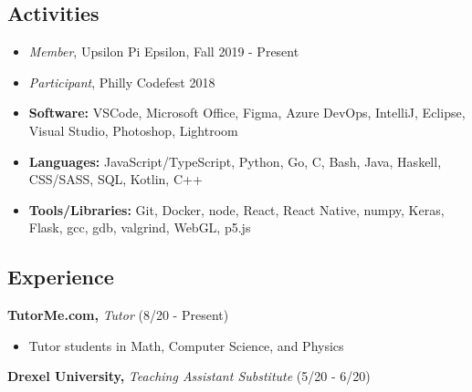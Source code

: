 \documentclass[10pt]{article}
\begin{document}
\begin{multicols}{2}
    \vspace{-\topsep}
    \subsection*{Activities}%
    \label{sub:Activities}

    \vspace{-\topsep}
    \begin{itemize}[leftmargin=*,noitemsep,topsep=0pt]
        \item \emph{Member}, Upsilon Pi Epsilon,
            Fall 2019 - Present
        \item \emph{Participant}, Philly Codefest 2018
    \end{itemize}

    \vfill\null
\end{multicols}

\vspace{-2.5em}
\begin{itemize}[leftmargin=*,noitemsep,topsep=0pt]
    \item \textbf{Software:} VSCode, Microsoft Office, Figma, Azure DevOps,
        IntelliJ, Eclipse, Visual Studio, Photoshop, Lightroom
    \item \textbf{Languages:} JavaScript/TypeScript, Python, Go, C,
        Bash, Java, Haskell, CSS/SASS, SQL, Kotlin, C++
    \item \textbf{Tools/Libraries:} Git, Docker, node, React,
        React Native, numpy, Keras, Flask, gcc, gdb, valgrind, WebGL, p5.js
\end{itemize}

\vspace{-1.5em}
\subsection*{Experience}%
\label{sub:Experience}

\vspace{-0.5em}
\textbf{TutorMe.com,}
\emph{Tutor}
(8/20 - Present)

\vspace{-\topsep}
\begin{itemize}
    \setlength\itemsep{-0.5em}
    \item Tutor students in Math, Computer Science, and Physics
\end{itemize}

\vspace{-0.5em}
\textbf{Drexel University,}
\emph{Teaching Assistant Substitute}
(5/20 - 6/20)
\end{document}
